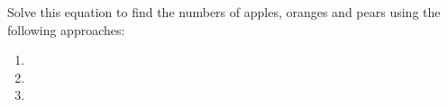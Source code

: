Solve this equation to find the numbers of apples, oranges and pears using the following approaches:

\begin{enumerate}
    \item 
    \item 
    \item 
\end{enumerate}
